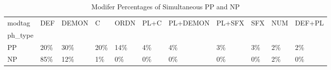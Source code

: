\begin{table}[htbp!]
\centering
\caption{Modifer Percentages of Simultaneous PP and NP}
\label{table:simmod_pc}
\begin{adjustbox}{width=1\textwidth}
\begin{tabular}{lllllllllll}
\toprule
modtag &  DEF & DEMON &    C & ORDN & PL+C & PL+DEMON & PL+SFX & SFX & NUM & DEF+PL \\
ph\_type &      &       &      &      &      &          &        &     &     &        \\
\midrule
PP      &  20\% &   30\% &  20\% &  14\% &   4\% &       4\% &     3\% &  3\% &  2\% &     2\% \\
NP      &  85\% &   12\% &   1\% &   0\% &   0\% &       0\% &     0\% &  0\% &  2\% &     0\% \\
\bottomrule
\end{tabular}
\end{adjustbox}
\end{table}
